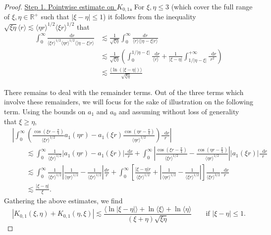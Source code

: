 \documentclass[11 pt]{amsart}
\newcommand{\tmem}{\underline}
\theoremstyle{definition}
\theoremstyle{remark}
\numberwithin{equation}{section}
\newcommand{\dd}{\mathop{}\!\mathrm{d}}
\begin{document}
\begin{proof}  {\tmem{Step 1. Pointwise estimate on $K_{0,1}$.}}
For $ \xi ,  \eta \leqslant 3$ (which cover the full range of $\xi,
  \eta \in \mathbb{R}^+$ such that $| \xi - \eta | \leqslant 1$) it follows from the inequality $\sqrt{\xi \eta} \langle r \rangle \lesssim \langle \eta r \rangle^{1/2} \langle \xi r \rangle^{1/2}$ that
\begin{align*}
\int_0^\infty \frac{\dd r}{\langle \xi r \rangle^{1 / 2} \langle \eta r \rangle^{1 / 2} \langle | \eta - \xi | r \rangle} & \lesssim \frac{1}{\sqrt{\xi \eta}} \int_0^\infty \frac{d
    r}{\langle r \rangle \langle | \eta - \xi | r \rangle}\\
    & \lesssim \frac{1}{\sqrt{\xi \eta}} \left( \int_0^{1 / | \eta - \xi |} \frac{\dd r}{\langle r \rangle } +
    \frac{1}{| \xi - \eta |} \int_{1 / | \eta - \xi |}^{+ \infty} \frac{\dd r}{r^2} \right)\\
    & \lesssim  \frac{\langle \ln (| \xi - \eta |) \rangle}{\sqrt{\xi \eta}}
  \end{align*}

There remains to deal with the remainder terms. Out of the three terms which involve these remainders, we will focus for the sake of illustration on the following term. Using the bounds on $a_1$ and $a_0$ and assuming without loss of generality that $\xi \geq \eta$,
\begin{align*}
& \left|  \int_0^\infty \left( \frac{\cos(\xi r - \frac \pi 4)}{\langle \xi r \rangle^{1/2}} a_1(\eta r) - a_1(\xi r)  \frac{\cos(\eta r - \frac \pi 4)}{\langle \eta r \rangle^{1/2}} \right)
 \frac{\dd r}{r} \right| \\
& \qquad \lesssim \int_0^\infty \frac{1}{\langle \xi r \rangle^{1/2}} |a_1(\eta r) - a_1(\xi r)| \frac{\dd r}{r} + \int_0^\infty \left| \frac{\cos(\xi r - \frac \pi 4)}{\langle \xi r \rangle^{1/2}} - \frac{\cos(\eta r- \frac \pi 4)}{\langle \eta r \rangle^{1/2}} \right| |a_1(\xi r)| \frac{\dd r}{r}  \\
& \qquad \lesssim  \int_0^\infty \frac{1}{\langle \xi r \rangle^{1/2}} \left| \frac{1}{\langle \eta r \rangle^{1/2}} - \frac{1}{\langle \xi r \rangle^{1/2}} \right|  \frac{dr}{r}  +  \int_0^\infty \left[ \frac{|\xi - \eta| r }{\langle \xi r \rangle^{1/2}} + \left| \frac{1}{\langle \eta r \rangle^{1/2}} - \frac{1}{\langle \xi r \rangle^{1/2}} \right| \right] \frac{1}{\langle \xi r \rangle^{3/2}} \frac{\dd r}{r} \\
& \qquad \lesssim \frac{|\xi-\eta|}{\xi}.
\end{align*}
Gathering the above estimates, we find 
$$
\left| K_{0, 1} (\xi, \eta) + K_{0, 1} (\eta,\xi) \right| \lesssim \frac{\langle \ln | \xi - \eta |  \rangle +  \ln \langle \xi  \rangle + \ln \langle \eta  \rangle}{(\xi+\eta) \sqrt{\xi \eta}} \qquad \mbox{if $|\xi - \eta| \leq 1$.}
$$




\end{proof}
\end{document}
